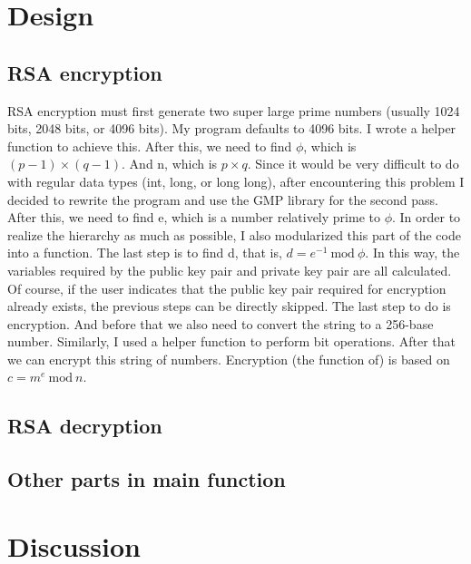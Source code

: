 \documentclass{article}
\begin{document}
\section{Design}
    \subsection{RSA encryption}
        RSA encryption must first generate two super large prime numbers (usually 1024 bits, 2048 bits, or 4096 bits). My program defaults to 4096 bits. I wrote a helper function to achieve this. After this, we need to find $\phi$, which is $(p-1)\times(q-1)$. And n, which is $p\times q$. Since it would be very difficult to do with regular data types (int, long, or long long), after encountering this problem I decided to rewrite the program and use the GMP library for the second pass. After this, we need to find e, which is a number relatively prime to $\phi$. In order to realize the hierarchy as much as possible, I also modularized this part of the code into a function. The last step is to find d, that is, $d = e^{-1}\ \mathrm{mod}\ \phi$. In this way, the variables required by the public key pair and private key pair are all calculated. Of course, if the user indicates that the public key pair required for encryption already exists, the previous steps can be directly skipped. The last step to do is encryption. And before that we also need to convert the string to a 256-base number. Similarly, I used a helper function to perform bit operations. After that we can encrypt this string of numbers. Encryption (the function of) is based on $c = m^e\ \mathrm{mod}\ n$.
    \subsection{RSA decryption}
    \subsection{Other parts in main function}
\section{Discussion}
\end{document}
